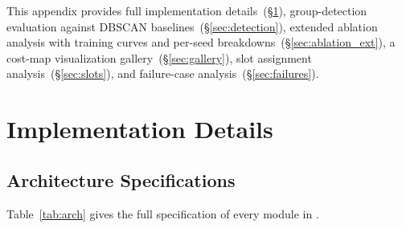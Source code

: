 
\renewcommand{\thefigure}{A\arabic{figure}}
\renewcommand{\thetable}{A\arabic{table}}
\renewcommand{\theequation}{A\arabic{equation}}
\setcounter{figure}{0}
\setcounter{table}{0}
\setcounter{equation}{0}

\newcommand{\figplaceholder}[2]{%
  \begin{tcolorbox}[colback=gray!10,colframe=gray!50,
                    width=\linewidth,height=#1,
                    halign=center,valign=center]
    \textit{\small #2}
  \end{tcolorbox}%
}

\noindent
This appendix provides full implementation details~(\S\ref{sec:impl}),
group-detection evaluation against DBSCAN baselines~(\S\ref{sec:detection}),
extended ablation analysis with training curves and per-seed
breakdowns~(\S\ref{sec:ablation_ext}), a cost-map visualization
gallery~(\S\ref{sec:gallery}), slot assignment
analysis~(\S\ref{sec:slots}), and failure-case analysis~(\S\ref{sec:failures}).

\section{Implementation Details}
\label{sec:impl}

\subsection{Architecture Specifications}

Table~\ref{tab:arch} gives the full specification of every module in \grace{}.

